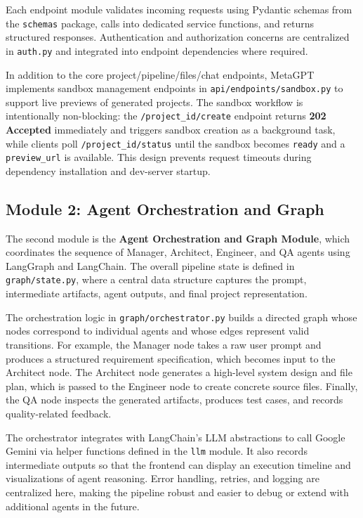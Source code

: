 Each endpoint module validates incoming requests using Pydantic schemas from the \texttt{schemas} package, calls into dedicated service functions, and returns structured responses. Authentication and authorization concerns are centralized in \texttt{auth.py} and integrated into endpoint dependencies where required.

In addition to the core project/pipeline/files/chat endpoints, MetaGPT implements sandbox management endpoints in \texttt{api/endpoints/sandbox.py} to support live previews of generated projects. The sandbox workflow is intentionally non-blocking: the \texttt{/{project\_id}/create} endpoint returns \textbf{202 Accepted} immediately and triggers sandbox creation as a background task, while clients poll \texttt{/{project\_id}/status} until the sandbox becomes \texttt{ready} and a \texttt{preview\_url} is available. This design prevents request timeouts during dependency installation and dev-server startup.

\subsection{Module 2: Agent Orchestration and Graph}

The second module is the \textbf{Agent Orchestration and Graph Module}, which coordinates the sequence of Manager, Architect, Engineer, and QA agents using LangGraph and LangChain. The overall pipeline state is defined in \texttt{graph/state.py}, where a central data structure captures the prompt, intermediate artifacts, agent outputs, and final project representation.

The orchestration logic in \texttt{graph/orchestrator.py} builds a directed graph whose nodes correspond to individual agents and whose edges represent valid transitions. For example, the Manager node takes a raw user prompt and produces a structured requirement specification, which becomes input to the Architect node. The Architect node generates a high-level system design and file plan, which is passed to the Engineer node to create concrete source files. Finally, the QA node inspects the generated artifacts, produces test cases, and records quality-related feedback.

The orchestrator integrates with LangChain’s LLM abstractions to call Google Gemini via helper functions defined in the \texttt{llm} module. It also records intermediate outputs so that the frontend can display an execution timeline and visualizations of agent reasoning. Error handling, retries, and logging are centralized here, making the pipeline robust and easier to debug or extend with additional agents in the future.

